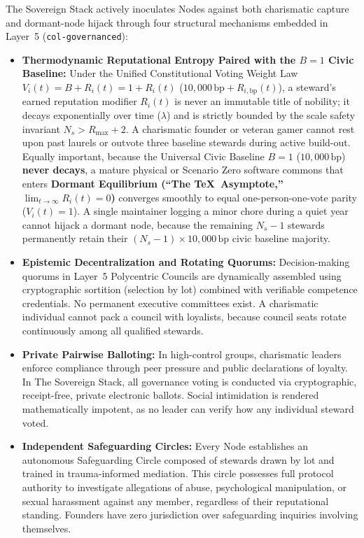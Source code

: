 The Sovereign Stack actively inoculates Nodes against both charismatic capture and dormant-node hijack through four structural mechanisms embedded in Layer~5 (\texttt{col-governanced}):
\begin{itemize}
    \item \textbf{Thermodynamic Reputational Entropy Paired with the $B = 1$ Civic Baseline:} Under the Unified Constitutional Voting Weight Law $V_i(t) = B + R_i(t) = 1 + R_i(t)$ ($10{,}000\,\mathrm{bp} + R_{i,\mathrm{bp}}(t)$), a steward's earned reputation modifier $R_i(t)$ is never an immutable title of nobility; it decays exponentially over time ($\lambda$) and is strictly bounded by the scale safety invariant $N_s > R_{\max} + 2$. A charismatic founder or veteran gamer cannot rest upon past laurels or outvote three baseline stewards during active build-out. Equally important, because the Universal Civic Baseline $B = 1$ ($10{,}000\,\mathrm{bp}$) \textbf{never decays}, a mature physical or Scenario Zero software commons that enters \textbf{Dormant Equilibrium (``The \TeX\ Asymptote,'' $\lim_{t \to \infty} R_i(t) = 0$)} converges smoothly to equal one-person-one-vote parity ($V_i(t) = 1$). A single maintainer logging a minor chore during a quiet year cannot hijack a dormant node, because the remaining $N_s - 1$ stewards permanently retain their $(N_s - 1) \times 10{,}000\,\mathrm{bp}$ civic baseline majority.
    \item \textbf{Epistemic Decentralization and Rotating Quorums:} Decision-making quorums in Layer~5 Polycentric Councils are dynamically assembled using cryptographic sortition (selection by lot) combined with verifiable competence credentials. No permanent executive committees exist. A charismatic individual cannot pack a council with loyalists, because council seats rotate continuously among all qualified stewards.
    \item \textbf{Private Pairwise Balloting:} In high-control groups, charismatic leaders enforce compliance through peer pressure and public declarations of loyalty. In The Sovereign Stack, all governance voting is conducted via cryptographic, receipt-free, private electronic ballots. Social intimidation is rendered mathematically impotent, as no leader can verify how any individual steward voted.
    \item \textbf{Independent Safeguarding Circles:} Every Node establishes an autonomous Safeguarding Circle composed of stewards drawn by lot and trained in trauma-informed mediation. This circle possesses full protocol authority to investigate allegations of abuse, psychological manipulation, or sexual harassment against any member, regardless of their reputational standing. Founders have zero jurisdiction over safeguarding inquiries involving themselves.
\end{itemize}

